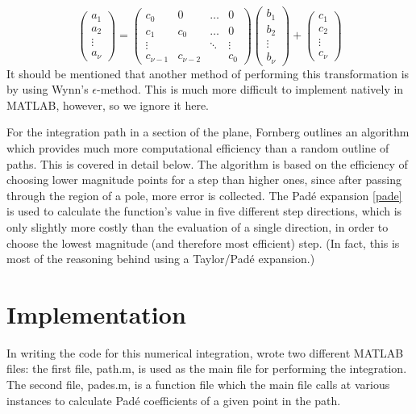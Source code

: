 \documentclass[12pt]{article}
\begin{document}
\begin{equation} \label{find_a}
 \left( \begin{array}{c} a_1 \\ a_2 \\ \vdots \\ a_\nu \end{array} \right) = \left( \begin{array}{cccc} c_0 & 0 & \dots & 0 \\ c_1 & c_0 & \dots & 0 \\ \vdots & & \ddots & \vdots \\ c_{\nu-1} & c_{\nu-2} & & c_0 \end{array} \right) \left( \begin{array}{c} b_1 \\ b_2 \\ \vdots \\ b_\nu \end{array} \right) + \left( \begin{array}{c} c_1 \\ c_2 \\ \vdots \\ c_\nu \end{array} \right) 
\end{equation}
It should be mentioned that another method of performing this transformation is by using Wynn's $\epsilon$-method. This is much more difficult to implement natively in MATLAB, however, so we ignore it here. 


For the integration path in a section of the plane, Fornberg outlines an algorithm which provides much more computational efficiency than a random outline of paths. This is covered in detail below. The algorithm is based on the efficiency of choosing lower magnitude points for a step than higher ones, since after passing through the region of a pole, more error is collected. The Pad\'{e} expansion \eqref{pade} is used to calculate the function's value in five different step directions, which is only slightly more costly than the evaluation of a single direction, in order to choose the lowest magnitude (and therefore most efficient) step. (In fact, this is most of the reasoning behind using a Taylor/Pad\'{e} expansion.)


\section{ Implementation }
In writing the code for this numerical integration, wrote two different MATLAB files: the first file, path.m, is used as the main file for performing the integration. The second file, pades.m,                                                                                                                                          is a function file which the main file calls at various instances to calculate Pad\'{e} coefficients of a given point in the path.
\end{document}
